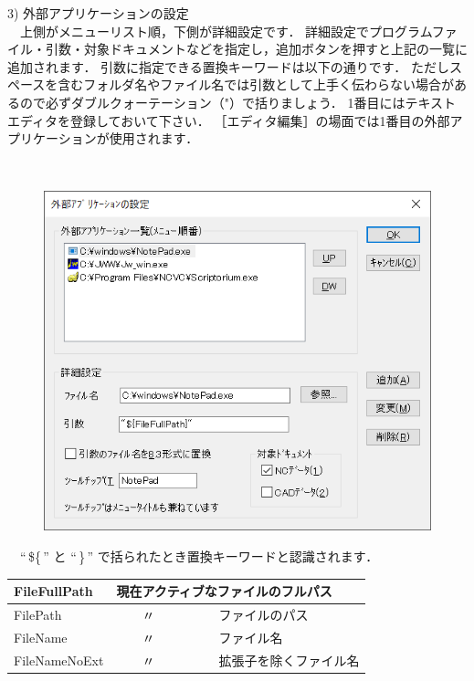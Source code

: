 \begin{minipage}[t]{0.38\textwidth}
3) 外部アプリケーションの設定\\
　上側がメニューリスト順，下側が詳細設定です．
詳細設定でプログラムファイル・引数・対象ドキュメントなどを指定し，追加ボタンを押すと上記の一覧に追加されます．
引数に指定できる置換キーワードは以下の通りです．
ただしスペースを含むフォルダ名やファイル名では引数として上手く伝わらない場合があるので必ずダブルクォーテーション（"）で括りましょう．
1番目にはテキストエディタを登録しておいて下さい．
［エディタ編集］の場面では1番目の外部アプリケーションが使用されます．
\end{minipage}
\begin{minipage}[t]{0.02\textwidth}
　
\end{minipage}
\begin{minipage}[t]{0.6\textwidth}
\vspace*{-2zh}
\begin{figure}[H]
\centering
\includegraphics[width=\textwidth]{No6/fig/app.png}
\label{fig:app.png}
\end{figure}
\end{minipage}

\vspace*{2zh}
　``\,\$\{\,'' と ``\,\}\,'' で括られたとき置換キーワードと認識されます．
\begin{table}[H]
\centering
\begin{tabular}{|p{3cm}|p{10cm}|}
\hline
FileFullPath & 現在アクティブなファイルのフルパス \\ \hline
FilePath     & 　　〃　　　　　ファイルのパス \\ \hline
FileName     & 　　〃　　　　　ファイル名 \\ \hline
FileNameNoExt& 　　〃　　　　　拡張子を除くファイル名 \\ \hline
\end{tabular}
\end{table}

